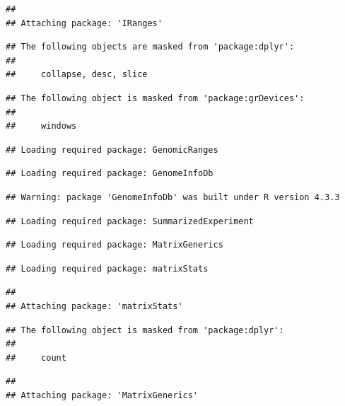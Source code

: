 \documentclass[
]{article}
\begin{document}
\begin{verbatim}
## 
## Attaching package: 'IRanges'
\end{verbatim}

\begin{verbatim}
## The following objects are masked from 'package:dplyr':
## 
##     collapse, desc, slice
\end{verbatim}

\begin{verbatim}
## The following object is masked from 'package:grDevices':
## 
##     windows
\end{verbatim}

\begin{verbatim}
## Loading required package: GenomicRanges
\end{verbatim}

\begin{verbatim}
## Loading required package: GenomeInfoDb
\end{verbatim}

\begin{verbatim}
## Warning: package 'GenomeInfoDb' was built under R version 4.3.3
\end{verbatim}

\begin{verbatim}
## Loading required package: SummarizedExperiment
\end{verbatim}

\begin{verbatim}
## Loading required package: MatrixGenerics
\end{verbatim}

\begin{verbatim}
## Loading required package: matrixStats
\end{verbatim}

\begin{verbatim}
## 
## Attaching package: 'matrixStats'
\end{verbatim}

\begin{verbatim}
## The following object is masked from 'package:dplyr':
## 
##     count
\end{verbatim}

\begin{verbatim}
## 
## Attaching package: 'MatrixGenerics'
\end{verbatim}
\end{document}
